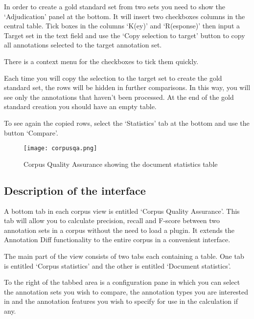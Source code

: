 In order to create a gold standard set from two sets you need to show the
`Adjudication' panel at the bottom. It will insert two checkboxes columns in
the central table. Tick boxes in the columns `K(ey)' and `R(esponse)' then
input a Target set in the text field and use the `Copy selection to target'
button to copy all annotations selected to the target annotation set.

There is a context menu for the checkboxes to tick them quickly.

Each time you will copy the selection to the target set to create the gold
standard set, the rows will be hidden in further comparisons. In this way,
you will see only the annotations that haven't been processed. At the end of
the gold standard creation you should have an empty table.

To see again the copied rows, select the `Statistics' tab at the bottom and
use the button `Compare'.


\begin{figure}[htbp]
\begin{center}
\texttt{[image: corpusqa.png]}
\end{center}
\caption{Corpus Quality Assurance showing the document statistics table}
\label{fig:corpusqa}
\end{figure}

\subsection{Description of the interface}

A bottom tab in each corpus view is entitled `Corpus Quality
Assurance'. This tab will allow you to calculate precision, recall and F-score
between two annotation sets in a corpus without the need to load a plugin. It
extends the Annotation Diff functionality to the entire corpus in a convenient
interface.

The main part of the view consists of two tabs each containing a table. One tab
is entitled `Corpus statistics' and the other is entitled `Document
statistics'.

To the right of the tabbed area is a configuration pane in which
you can select the annotation sets you wish to compare, the annotation types
you are interested in and the annotation features you wish to specify for use
in the calculation if any.

